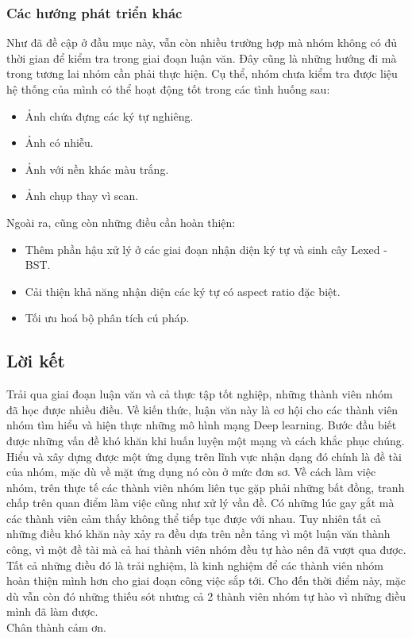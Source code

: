 \documentclass[a4paper,12pt]{article}
\begin{document}
	\subsubsection{Các hướng phát triển khác}
	Như đã đề cập ở đầu mục này, vẫn còn nhiều trường hợp mà nhóm không có đủ thời gian để kiểm tra trong giai đoạn luận văn. Đây cũng là những hướng đi mà trong tương lai nhóm cần phải thực hiện. Cụ thể, nhóm chưa kiểm tra được liệu hệ thống của mình có thể hoạt động tốt trong các tình huống sau:
	\begin{itemize}
		\item Ảnh chứa đựng các ký tự nghiêng.
		\item Ảnh có nhiễu.
		\item Ảnh với nền khác màu trắng.
		\item Ảnh chụp thay vì scan.
		
	\end{itemize}
	\vspace{1cm}
	Ngoài ra, cũng còn những điều cần hoàn thiện:
	\begin{itemize}
		\item Thêm phần hậu xử lý ở các giai đoạn nhận diện ký tự và sinh cây Lexed - BST.
		\item Cải thiện khả năng nhận diện các ký tự có aspect ratio đặc biệt.
		\item Tối ưu hoá bộ phân tích cú pháp. 
	\end{itemize}
	
	\newpage
	\subsection*{Lời kết}
	Trải qua giai đoạn luận văn và cả thực tập tốt nghiệp, những thành viên nhóm đã học được nhiều điều. Về kiến thức, luận văn này là cơ hội cho các thành viên nhóm tìm hiểu và hiện thực những mô hình mạng Deep learning. Bước đầu biết được những vấn đề khó khăn khi huấn luyện một mạng và cách khắc phục chúng. Hiểu và xây dựng được một ứng dụng trên lĩnh vực nhận dạng đó chính là đề tài của nhóm, mặc dù về mặt ứng dụng nó còn ở mức đơn sơ. Về cách làm việc nhóm, trên thực tế các thành viên nhóm liên tục gặp phải những bất đồng, tranh chấp trên quan điểm làm việc cũng như xử lý vần đề. Có những lúc gay gắt mà các thành viên cảm thấy không thể tiếp tục được với nhau. Tuy nhiên tất cả những điều khó khăn này xảy ra đều dựa trên nền tảng vì một luận văn thành công, vì một đề tài mà cả hai thành viên nhóm đều tự hào nên đã vượt qua được. Tất cả những điều đó là trải nghiệm, là kinh nghiệm để các thành viên nhóm hoàn thiện mình hơn cho giai đoạn công việc sắp tới. Cho đến thời điểm này, mặc dù vẫn còn đó những thiếu sót nhưng cả 2 thành viên nhóm tự hào vì những điều mình đã làm được. \\
	Chân thành cảm ơn. 
	
	\newpage
	
	
\end{document}
